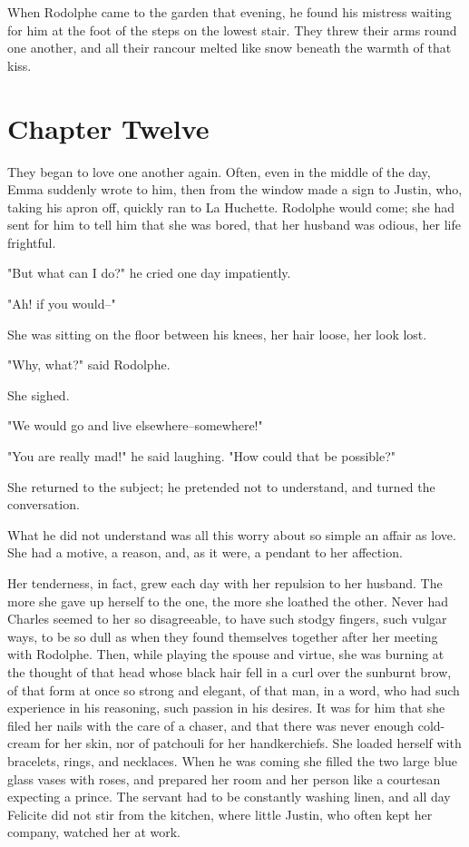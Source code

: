 \documentclass{tufte-book}
\begin{document}
When Rodolphe came to the garden that evening, he found his mistress
waiting for him at the foot of the steps on the lowest stair. They threw
their arms round one another, and all their rancour melted like snow
beneath the warmth of that kiss.



\chapter{Chapter Twelve}

They began to love one another again. Often, even in the middle of the
day, Emma suddenly wrote to him, then from the window made a sign to
Justin, who, taking his apron off, quickly ran to La Huchette. Rodolphe
would come; she had sent for him to tell him that she was bored, that
her husband was odious, her life frightful.

"But what can I do?" he cried one day impatiently.

"Ah! if you would--"

She was sitting on the floor between his knees, her hair loose, her look
lost.

"Why, what?" said Rodolphe.

She sighed.

"We would go and live elsewhere--somewhere!"

"You are really mad!" he said laughing. "How could that be possible?"

She returned to the subject; he pretended not to understand, and turned
the conversation.

What he did not understand was all this worry about so simple an affair
as love. She had a motive, a reason, and, as it were, a pendant to her
affection.

Her tenderness, in fact, grew each day with her repulsion to her
husband. The more she gave up herself to the one, the more she loathed
the other. Never had Charles seemed to her so disagreeable, to have
such stodgy fingers, such vulgar ways, to be so dull as when they found
themselves together after her meeting with Rodolphe. Then, while playing
the spouse and virtue, she was burning at the thought of that head whose
black hair fell in a curl over the sunburnt brow, of that form at once
so strong and elegant, of that man, in a word, who had such experience
in his reasoning, such passion in his desires. It was for him that she
filed her nails with the care of a chaser, and that there was never
enough cold-cream for her skin, nor of patchouli for her handkerchiefs.
She loaded herself with bracelets, rings, and necklaces. When he
was coming she filled the two large blue glass vases with roses, and
prepared her room and her person like a courtesan expecting a prince.
The servant had to be constantly washing linen, and all day Felicite
did not stir from the kitchen, where little Justin, who often kept her
company, watched her at work.
\end{document}
